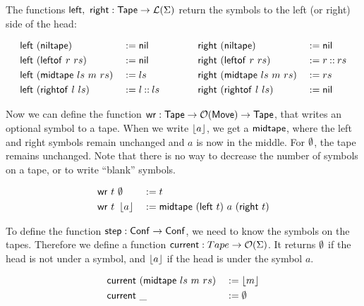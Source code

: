 The functions $\mathsf{left},~\mathsf{right} : \mathsf{Tape} \rightarrow \mathcal{L}(\Sigma)$ return the symbols to the left (or right) side of the head:
\begin{definition}
  \begin{alignat*}{4}
    \mathsf{left} &~(\mathsf{niltape})                 &&:= \mathsf{nil}
    \quad\quad\quad\quad
    & \mathsf{right}&~(\mathsf{niltape})               &&:= \mathsf{nil} \\
    \mathsf{left} &~(\mathsf{leftof}~{r}~{rs})         &&:= \mathsf{nil}
    & \mathsf{right}&~(\mathsf{leftof}~{r}~{rs})       &&:= r \mathbin{::} rs \\
    \mathsf{left} &~(\mathsf{midtape}~{ls}~{m}~{rs})   &&:= ls
    & \mathsf{right}&~(\mathsf{midtape}~{ls}~{m}~{rs}) &&:= rs \\
    \mathsf{left} &~(\mathsf{rightof}~{l}~{ls})        &&:= l \mathbin{::} ls
    & \mathsf{right}&~(\mathsf{rightof}~{l}~{ls})      &&:= \mathsf{nil}
  \end{alignat*}
\end{definition}


Now we can define the function $\mathsf{wr} : \mathsf{Tape} \rightarrow \mathcal{O}(\mathsf{Move}) \rightarrow \mathsf{Tape}$, that writes an optional symbol to a tape.  When we write $\left\lfloor {a} \right\rfloor$,
we get a $\mathsf{midtape}$, where the left and right symbols remain unchanged and $a$ is now in the middle.  For $\emptyset$, the tape remains unchanged.
Note that there is no way to decrease the number of symbols on a tape, or to write ``blank'' symbols.

\begin{definition}
  \begin{alignat*}{3}
    \mathsf{wr}~t &~ \emptyset   &&:= t \\
    \mathsf{wr}~t &~ \left\lfloor {a} \right\rfloor &&:= \mathsf{midtape}~(\mathsf{left}~t)~{a}~(\mathsf{right}~t)
  \end{alignat*}
\end{definition}

To define the function $\mathsf{step} : \mathsf{Conf} \rightarrow \mathsf{Conf}$, we need to know the symbols on the tapes.  Therefore we define a function
$\mathsf{current} : Tape \rightarrow \mathcal{O}(\Sigma)$.  It returns $\emptyset$ if the head is not under a symbol, and $\left\lfloor {a} \right\rfloor$ if the head is under the symbol
$a$.

\begin{definition}[$\MS{current}$][current]
  \begin{alignat*}{2}
    \mathsf{current}&~(\mathsf{midtape}~{ls}~{m}~{rs})&&:= \left\lfloor {m} \right\rfloor \\
    \mathsf{current}&~\_                          &&:= \emptyset
  \end{alignat*}
\end{definition}

